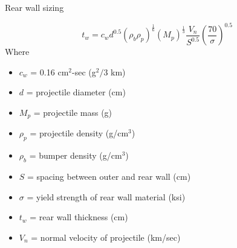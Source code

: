 \documentclass[11pt,a4paper]{article}
\begin{document}
Rear wall sizing

\begin{equation}
    t_w = c_w d^{0.5} (\rho_b \rho_p)^{\frac{1}{6}}(M_p)^{\frac{1}{3}}\frac{V_n}{S^{0.5}}(\frac{70}{\sigma})^{0.5}
\end{equation}
Where
\begin{itemize}
    \item $c_w$ = 0.16 cm$^2$-sec (g$^2/3$ km)
    \item $d$ = projectile diameter (cm)
    \item $M_p$ = projectile mass (g)
    \item $\rho_p$ = projectile density (g/cm$^3$)
    \item $\rho_b$ = bumper density (g/cm$^3$)
    \item $S$ = spacing between outer and rear wall (cm)
    \item $\sigma$ = yield strength of rear wall material (ksi)
    \item $t_w$ = rear wall thickness (cm)
    \item $V_n$ = normal velocity of projectile (km/sec)
\end{itemize}
\end{document}

